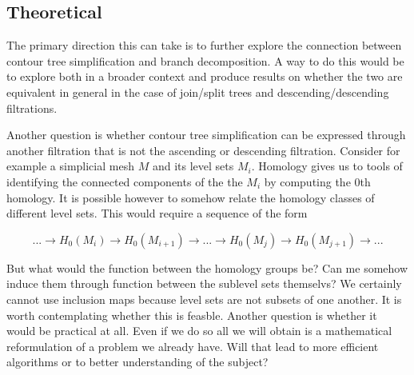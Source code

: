 \subsection{Theoretical}


The primary direction this can take is to further explore the connection between contour tree simplification and branch decomposition. A way to do this would be to explore both in a broader context and produce results on whether the two are equivalent in general in the case of join/split trees and descending/descending filtrations.

Another question is whether contour tree simplification can be expressed through another filtration that is not the ascending or descending filtration. Consider for example a simplicial mesh $M$ and its level sets $M_i$. Homology gives us to tools of identifying the connected components of the the $M_i$ by computing the 0th homology. It is possible however to somehow relate the homology classes of different level sets. This would require a sequence of the form

$$ ... \rightarrow H_0(M_i) \rightarrow H_0(M_{i+1}) \rightarrow ... \rightarrow H_0(M_{j}) \rightarrow H_0(M_{j+1}) \rightarrow ...$$

But what would the function between the homology groups be? Can me somehow induce them through function between the sublevel sets themselvs? We certainly cannot use inclusion maps because level sets are not subsets of one another. It is worth contemplating whether this is feasble. Another question is whether it would be practical at all. Even if we do so all we will obtain is a mathematical reformulation of a problem we already have. Will that lead to more efficient algorithms or to better understanding of the subject?

%
%
